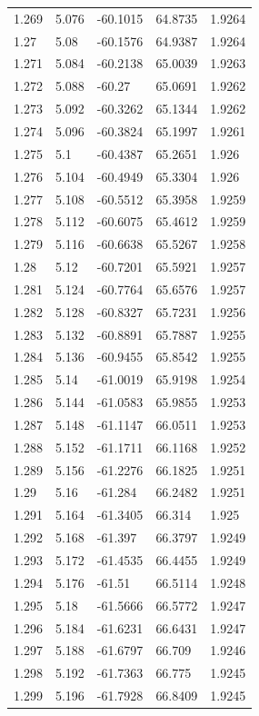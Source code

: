 \begin{tabular}{lllll}
1.269 & 5.076 & -60.1015 & 64.8735 & 1.9264 \\
1.27 & 5.08 & -60.1576 & 64.9387 & 1.9264 \\
1.271 & 5.084 & -60.2138 & 65.0039 & 1.9263 \\
1.272 & 5.088 & -60.27 & 65.0691 & 1.9262 \\
1.273 & 5.092 & -60.3262 & 65.1344 & 1.9262 \\
1.274 & 5.096 & -60.3824 & 65.1997 & 1.9261 \\
1.275 & 5.1 & -60.4387 & 65.2651 & 1.926 \\
1.276 & 5.104 & -60.4949 & 65.3304 & 1.926 \\
1.277 & 5.108 & -60.5512 & 65.3958 & 1.9259 \\
1.278 & 5.112 & -60.6075 & 65.4612 & 1.9259 \\
1.279 & 5.116 & -60.6638 & 65.5267 & 1.9258 \\
1.28 & 5.12 & -60.7201 & 65.5921 & 1.9257 \\
1.281 & 5.124 & -60.7764 & 65.6576 & 1.9257 \\
1.282 & 5.128 & -60.8327 & 65.7231 & 1.9256 \\
1.283 & 5.132 & -60.8891 & 65.7887 & 1.9255 \\
1.284 & 5.136 & -60.9455 & 65.8542 & 1.9255 \\
1.285 & 5.14 & -61.0019 & 65.9198 & 1.9254 \\
1.286 & 5.144 & -61.0583 & 65.9855 & 1.9253 \\
1.287 & 5.148 & -61.1147 & 66.0511 & 1.9253 \\
1.288 & 5.152 & -61.1711 & 66.1168 & 1.9252 \\
1.289 & 5.156 & -61.2276 & 66.1825 & 1.9251 \\
1.29 & 5.16 & -61.284 & 66.2482 & 1.9251 \\
1.291 & 5.164 & -61.3405 & 66.314 & 1.925 \\
1.292 & 5.168 & -61.397 & 66.3797 & 1.9249 \\
1.293 & 5.172 & -61.4535 & 66.4455 & 1.9249 \\
1.294 & 5.176 & -61.51 & 66.5114 & 1.9248 \\
1.295 & 5.18 & -61.5666 & 66.5772 & 1.9247 \\
1.296 & 5.184 & -61.6231 & 66.6431 & 1.9247 \\
1.297 & 5.188 & -61.6797 & 66.709 & 1.9246 \\
1.298 & 5.192 & -61.7363 & 66.775 & 1.9245 \\
1.299 & 5.196 & -61.7928 & 66.8409 & 1.9245 \\

\end{tabular}
